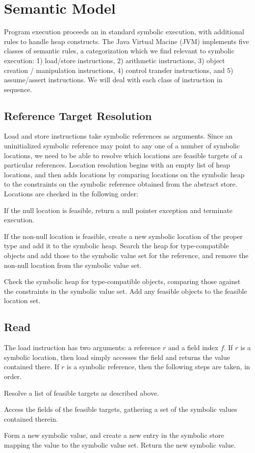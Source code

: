 \section{Semantic Model}
Program execution proceeds an in standard symbolic execution, with additional rules to handle heap constructs. The Java Virtual Macine (JVM) implements five classes of semantic rules, a categorization which we find relevant to symbolic execution: 1) load/store instructions, 2) arithmetic instructions, 3) object creation / manipulation instructions, 4) control transfer instructions, and 5) assume/assert instructions. We will deal with each class of instruction in sequence.
\subsection{Reference Target Resolution}
Load and store instructions take symbolic references as arguments. Since an uninitialized symbolic reference may point to any one of a number of symbolic locations, we need to be able to resolve which locations are feasible targets of a particular references.
Location resolution begins with an empty list of heap locations, and then adds locations by comparing locations on the symbolic heap to the constraints on the symbolic reference obtained from the abstract store. Locations are checked in the following order:
\begin{compactenum}
\item If the null location is feasible, return a null pointer exception and terminate execution.
\item If the non-null location is feasible, create a new symbolic location of the proper type and add it to the symbolic heap. Search the heap for type-compatible objects and add those to the symbolic value set for the reference, and remove the non-null location from the symbolic value set.
\item Check the symbolic heap for type-compatible objects, comparing those against the constraints in the symbolic value set. Add any feasible objects to the feasible location set.
\end{compactenum}

\subsection{Read}
The load instruction has two arguments: a reference $r$ and a field index $f$. If $r$ is a symbolic location, then load simply accesses the field and returns the value contained there. If $r$ is a symbolic reference, then the following steps are taken, in order.
\begin{compactenum}
\item Resolve a list of feasible targets as described above.
\item Access the fields of the feasible targets, gathering a set of the symbolic values contained therein. 
\item Form a new symbolic value, and create a new entry in the symbolic store mapping the value to the symbolic value set. Return the new symbolic value.
\end{compactenum}

